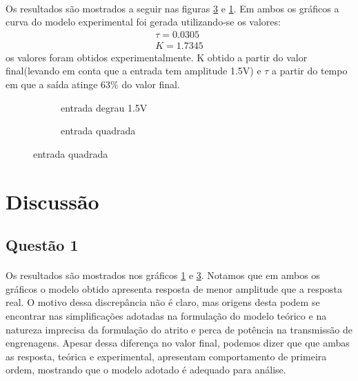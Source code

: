 \documentclass[a4paper,11pt]{article}
\begin{document}
\paragraph{}Os resultados são mostrados a seguir nas figuras 
\ref{fig:quadrada} e \ref{fig:step}. Em ambos os gráficos a curva do 
modelo experimental foi 
gerada utilizando-se os valores:
\begin{equation}
  \begin{array}{l}
   \tau = 0.0305 \\
    K =  1.7345
   \end{array}
\end{equation}
os valores foram obtidos experimentalmente. K obtido a partir do 
valor final(levando em conta que a entrada tem amplitude 1.5V) e 
$\tau$ a partir do tempo em que a saída atinge 63\% do valor final.

\FloatBarrier
\begin{figure}[!htp]
  \begin{subfigure}{\linewidth}
    
    \caption{entrada degrau 1.5V}
    \label{fig:step}
    \end{subfigure}
    
  \begin{subfigure}{\linewidth}    
    
    \caption{entrada quadrada}
    \label{fig:quadrada}
 \end{subfigure}
\end{figure}
\FloatBarrier




\section{Discussão}
\subsection{Questão 1}
\paragraph{} Os resultados são mostrados nos gráficos \ref{fig:step} e
\ref{fig:quadrada}. Notamos que em ambos os gráficos o modelo obtido apresenta
resposta de menor amplitude que a resposta real. O motivo dessa discrepância
não é claro, mas origens desta podem se encontrar nas simplificações adotadas
na formulação do modelo teórico e na natureza imprecisa da formulação do atrito
e perca de potência na transmissão de engrenagens. Apesar dessa diferença no
valor final, podemos dizer que que ambas as resposta, teórica e experimental,
apresentam comportamento de primeira ordem, mostrando que o modelo adotado é
adequado para análise.
\end{document}

